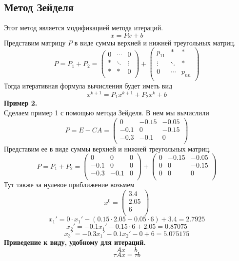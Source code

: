 \subsection{Метод Зейделя}
Этот метод является модификацией метода итераций. 
$$x=Px+b$$
Представим матрицу $P$ в виде суммы верхней и нижней треугольных матриц.
\[P=P_1+P_2= \begin{pmatrix}
0 & \cdots & 0\\
* & \ddots & \vdots\\
* & * & 0\\
\end{pmatrix} + \begin{pmatrix}
p_{11} & * & *\\
\vdots & \ddots & *\\
0 & \cdots & p_{nn}\\
\end{pmatrix}\]
Тогда итеративная формула вычисления будет иметь вид
$$x^{k+1}=P_1x^{k+1}+P_2x^k+b$$
\textbf{Пример 2.}\\
Сделаем пример 1 с помощью метода Зейделя. В нем мы вычислили
\[P=E-CA=\begin{pmatrix}
0 & -0.15 & -0.05\\
-0.1 & 0 & -0.15\\
-0.3 & -0.1 & 0\\
\end{pmatrix}\]
Представим ее в виде суммы верхней и нижней треугольных матриц.
\[P=P_1+P_2=\begin{pmatrix}
0 & 0 & 0\\
-0.1 & 0 & 0\\
-0.3 & -0.1 & 0\\
\end{pmatrix} + \begin{pmatrix}
0 & -0.15 & -0.05\\
0 & 0 & -0.15\\
0 & 0 & 0\\
\end{pmatrix}\]
Тут также за нулевое приближение возьмем
\[x^0=\begin{pmatrix}
3.4\\
2.05\\
6\\
\end{pmatrix}\]
$$x_1'=0\cdot x_1'-(0.15\cdot 2.05+0.05\cdot 6)+3.4=2.7925$$
$$x_2'=-0.1x_1'-0.15\cdot 6+2.05=0.87075$$
$$x_3'=-0.3x_1'-0.1x_2'-0+6=5.075175$$
\textbf{Приведение к виду, удобному для итераций.}\\
$$Ax=b$$
$$\tau Ax=\tau b$$
